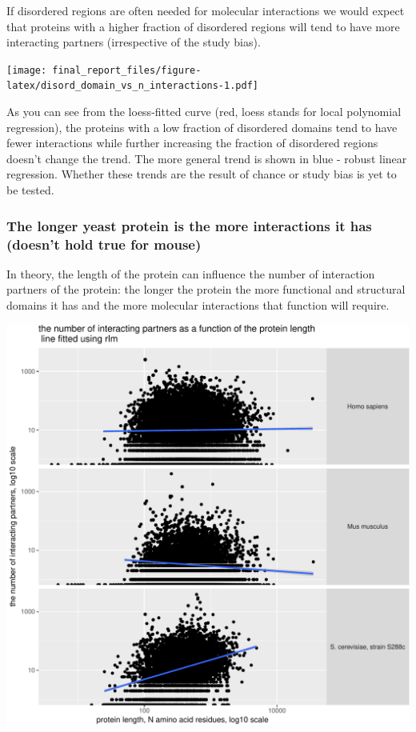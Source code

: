 \documentclass[]{article}
\begin{document}
If disordered regions are often needed for molecular interactions we
would expect that proteins with a higher fraction of disordered regions
will tend to have more interacting partners (irrespective of the study
bias).

\texttt{[image: final\_report\_files/figure-latex/disord\_domain\_vs\_n\_interactions-1.pdf]}

As you can see from the loess-fitted curve (red, loess stands for local
polynomial regression), the proteins with a low fraction of disordered
domains tend to have fewer interactions while further increasing the
fraction of disordered regions doesn't change the trend. The more
general trend is shown in blue - robust linear regression. Whether these
trends are the result of chance or study bias is yet to be tested.

\subsubsection{The longer yeast protein is the more interactions it has
(doesn't hold true for
mouse)}\label{the-longer-yeast-protein-is-the-more-interactions-it-has-doesnt-hold-true-for-mouse}

In theory, the length of the protein can influence the number of
interaction partners of the protein: the longer the protein the more
functional and structural domains it has and the more molecular
interactions that function will require.

\includegraphics{final_report_files/figure-latex/protein_mass_vs_n_interactions-1.pdf}
\end{document}

